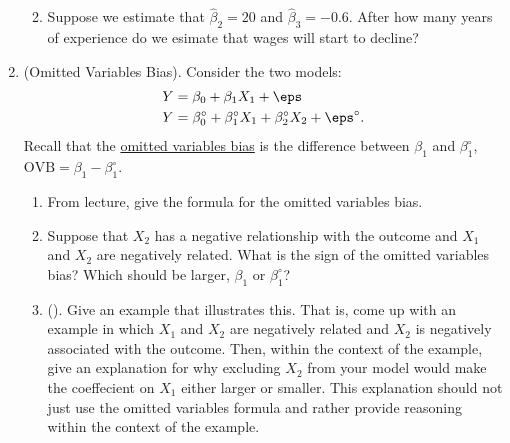 \documentclass[10pt]{article}
\begin{document}
\begin{enumerate}
\begin{enumerate}
		 
		 \item Suppose we estimate that \(\hat\beta_2 = 20\) and  \(\hat\beta_3 = -0.6\). After how many years of experience do we esimate that wages will  start to decline?

			  
	\end{enumerate}
		
	\item (Omitted Variables Bias). Consider the two models:
	\begin{align*}
		Y &= \beta_0 + \beta_1X_1 + \eps \\
		Y &= \beta_0^\circ + \beta_1^\circ X_1 + \beta_2^\circ X_2 + \eps^\circ
	.\end{align*}
	Recall that the \underline{omitted variables bias}  is the difference between  \(\beta_1\) and  \(\beta_1^\circ\),  \(\text{OVB} = \beta_1 - \beta_1^\circ\).
	\begin{enumerate}
		\item From lecture, give the formula for the omitted variables bias.

		 
		\item Suppose that \(X_2\) has a negative relationship with the outcome and  \(X_1\) and  \(X_2\) are negatively related. What is the sign of the omitted variables bias? Which should be larger, \(\beta_1\) or  \(\beta_1^\circ\)?

		 
		\item (). Give an example that illustrates this. That is, come up with an example in which \(X_1\) and  \(X_2\) are negatively related and  \(X_2\) is negatively associated with the outcome. Then, within the context of the example, give an explanation for why excluding \(X_2\) from your model would make the coeffecient on  \(X_1\) either larger or smaller. This explanation should not just use the omitted variables formula and rather provide reasoning within the context of the example.	

		 
	\end{enumerate}
\end{enumerate}
\end{document}
